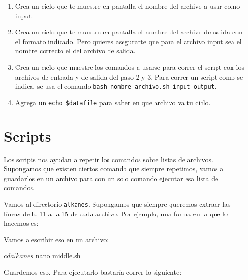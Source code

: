 \documentclass[
]{book}
\newenvironment{Shaded}{\begin{snugshade}}{\end{snugshade}}
\newcommand{\AttributeTok}[1]{\textcolor[rgb]{0.13,0.29,0.53}{#1}}
\newcommand{\ExtensionTok}[1]{#1}
\newcommand{\FunctionTok}[1]{\textcolor[rgb]{0.13,0.29,0.53}{\textbf{#1}}}
\newcommand{\KeywordTok}[1]{\textcolor[rgb]{0.13,0.29,0.53}{\textbf{#1}}}
\newcommand{\NormalTok}[1]{#1}
\begin{document}
\begin{enumerate}
\def\labelenumi{\arabic{enumi})}
\setcounter{enumi}{1}
\item
  Crea un ciclo que te muestre en pantalla el nombre del archivo a usar como input.
\item
  Crea un ciclo que te muestre en pantalla el nombre del archivo de salida con el formato indicado. Pero quieres asegurarte que para el archivo input sea el nombre correcto el del archivo de salida.
\item
  Crea un ciclo que muestre los comandos a usarse para correr el script con los archivos de entrada y de salida del paso 2 y 3. Para correr un script como se indica, se usa el comando \texttt{bash\ nombre\_archivo.sh\ input\ output}.
\item
  Agrega un \texttt{echo\ \$datafile} para saber en que archivo va tu ciclo.
\end{enumerate}

\hypertarget{scripts}{%
\section{Scripts}\label{scripts}}

Los scripts nos ayudan a repetir los comandos sobre listas de archivos. Supongamos que existen ciertos comando que siempre repetimos, vamos a guardarlos en un archivo para con un solo comando ejecutar esa lista de comandos.

Vamos al directorio \texttt{alkanes}. Supongamos que siempre queremos extraer las líneas de la 11 a la 15 de cada archivo. Por ejemplo, una forma en la que lo hacemos es:

\begin{Shaded}
\end{Shaded}

Vamos a escribir eso en un archivo:

\begin{Shaded}
\begin{Highlighting}[]
\ExtensionTok{$}\NormalTok{ cd alkanes}
\ExtensionTok{$}\NormalTok{ nano middle.sh}
\end{Highlighting}
\end{Shaded}

Guardemos eso. Para ejecutarlo bastaría correr lo siguiente:
\end{document}
